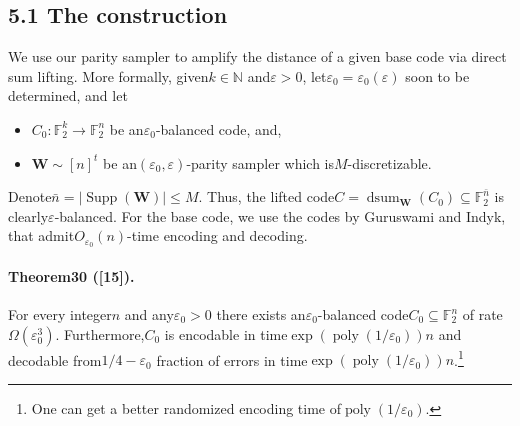 \documentclass[10pt,a4paper]{article}
\DeclareMathOperator{\dsum}{dsum}
\begin{document}
\subsection*{5.1 The construction}
We use our parity sampler to amplify the distance of a given base code via direct sum lifting. More formally, given$k\in\mathbb N$ and$\varepsilon>0$, let$\varepsilon_0=\varepsilon_0(\varepsilon)$ soon to be determined, and let
\begin{itemize}
\item $C_0:\mathbb F_2^k\to\mathbb F_2^n$ be an$\varepsilon_0$-balanced code, and,
\item $\mathbf W\sim[n]^t$ be an$(\varepsilon_0,\varepsilon)$-parity sampler which is$M$-discretizable.
\end{itemize}
Denote$\bar n=|\operatorname{Supp}(\mathbf W)|\leq M$. Thus, the lifted code$C=\dsum_{\mathbf W}(C_0)\subseteq\mathbb F_2^{\bar n}$ is clearly$\varepsilon$-balanced. For the base code, we use the codes by Guruswami and Indyk, that admit$O_{\varepsilon_0}(n)$-time encoding and decoding.
\paragraph{Theorem30 ([15]).} For every integer$n$ and any$\varepsilon_0>0$ there exists an$\varepsilon_0$-balanced code$C_0\subseteq\mathbb F_2^n$ of rate$\Omega(\varepsilon_0^3)$. Furthermore,$C_0$ is encodable in time$\exp(\operatorname{poly}(1/\varepsilon_0))n$ and decodable from$1/4-\varepsilon_0$ fraction of errors in time$\exp(\operatorname{poly}(1/\varepsilon_0))n$.\footnote{One can get a better randomized encoding time of$\operatorname{poly}(1/\varepsilon_0)$.}
\end{document}
